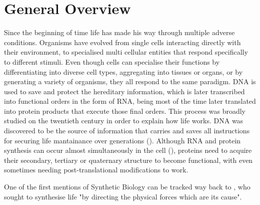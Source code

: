 \chapter{General Overview}

Since the beginning of time life has made his way through multiple adverse conditions. Organisms have evolved from single cells interacting directly with their environment, to specialised multi cellular entities that respond specifically to different stimuli. Even though cells can specialise their functions by differentiating into diverse cell types, aggregating into tissues or organs, or by generating a variety of organisms, they all respond to the same paradigm. DNA is used to save and protect the hereditary information, which is later transcribed into functional orders in the form of RNA, being most of the time later translated into protein products that execute those final orders. 
This process was broadly studied on the twentieth century in order to explain how life works.
DNA was discovered to be the source of information that carries and saves all instructions for securing life mantainance over generations (\cite{watson1953molecular}). Although RNA and protein synthesis can occur almost simultaneously in the cell  (\cite{miller1970visualization}), proteins need to acquire their secondary, tertiary or quaternary structure to become functional, with even sometimes needing post-translational modifications to work.  


One of the first mentions of Synthetic Biology can be tracked way back to \cite{leduc1912biologie}, who sought to synthesise life "by directing the physical forces which are its cause".



